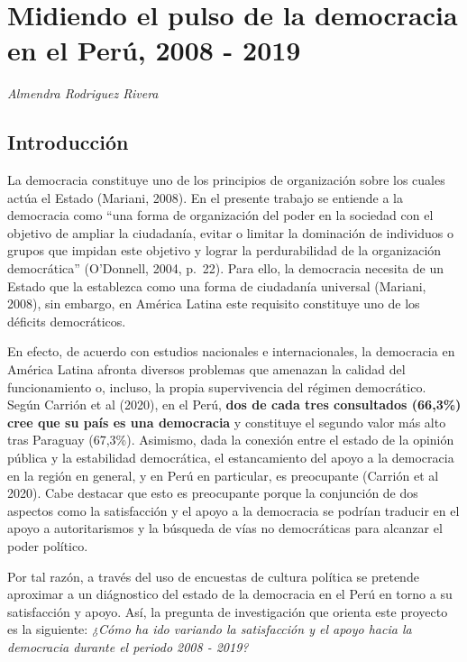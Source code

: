 \documentclass[
]{book}
\begin{document}
\hypertarget{pulsoDemocracia}{%
\chapter{Midiendo el pulso de la democracia en el Perú, 2008 - 2019}\label{pulsoDemocracia}}

\emph{Almendra Rodriguez Rivera}

\hypertarget{introducciuxf3n-3}{%
\section{Introducción}\label{introducciuxf3n-3}}

La democracia constituye uno de los principios de organización sobre los cuales actúa el Estado (Mariani, 2008). En el presente trabajo se entiende a la democracia como ``una forma de organización del poder en la sociedad con el objetivo de ampliar la ciudadanía, evitar o limitar la dominación de individuos o grupos que impidan este objetivo y lograr la perdurabilidad de la organización democrática'' (O'Donnell, 2004, p.~22). Para ello, la democracia necesita de un Estado que la establezca como una forma de ciudadanía universal (Mariani, 2008), sin embargo, en América Latina este requisito constituye uno de los déficits democráticos.

En efecto, de acuerdo con estudios nacionales e internacionales, la democracia en América Latina afronta diversos problemas que amenazan la calidad del funcionamiento o, incluso, la propia supervivencia del régimen democrático. Según Carrión et al (2020), en el Perú, \textbf{dos de cada tres consultados (66,3\%) cree que su país es una democracia} y constituye el segundo valor más alto tras Paraguay (67,3\%). Asimismo, dada la conexión entre el estado de la opinión pública y la estabilidad democrática, el estancamiento del apoyo a la democracia en la región en general, y en Perú en particular, es preocupante (Carrión et al 2020). Cabe destacar que esto es preocupante porque la conjunción de dos aspectos como la satisfacción y el apoyo a la democracia se podrían traducir en el apoyo a autoritarismos y la búsqueda de vías no democráticas para alcanzar el poder político.

Por tal razón, a través del uso de encuestas de cultura política se pretende aproximar a un diágnostico del estado de la democracia en el Perú en torno a su satisfacción y apoyo. Así, la pregunta de investigación que orienta este proyecto es la siguiente: \emph{¿Cómo ha ido variando la satisfacción y el apoyo hacia la democracia durante el periodo 2008 - 2019?}
\end{document}
